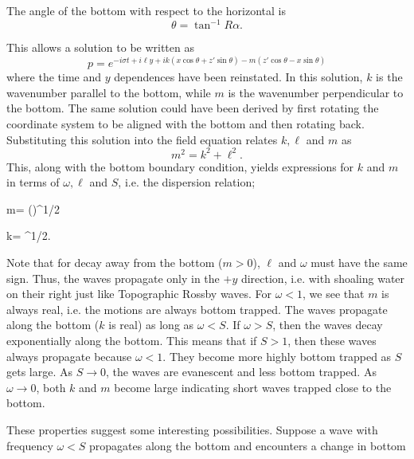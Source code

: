 The angle of the bottom with respect to the horizontal is
\[
	\theta=\tan^{-1}R\alpha.
\]

\sourcepagebreak

This allows a solution to be written as
\[
	p=e^{-i\sigma t+i\ell y
			+ik(x\cos\theta+z'\sin\theta)
			-m(z'\cos\theta-x\sin\theta)}
\]
where the time and $y$ dependences have been reinstated. In this solution, $k$ is the
wavenumber parallel to the bottom, while $m$ is the wavenumber perpendicular to the
bottom. The same solution could have been derived by first rotating the coordinate
system to be aligned with the bottom and then rotating back. Substituting this solution
into the field equation relates $k,\ell$ and $m$ as
\[
	m^2=k^2+\ell^2.
\]
This, along with the bottom boundary condition, yields expressions for $k$ and $m$ in
terms of $\omega,\ell$ and $S$, i.e. the dispersion relation;
\begin{waveequation}
	m=\frac{\ell}{\omega}
	\left(\right)^{1/2}
\end{waveequation}
\begin{waveequation}
	k=\frac{\ell}{\omega}
	^{1/2}.
\end{waveequation}
Note that for decay away from the bottom ($m>0$), $\ell$ and $\omega$ must have the
same sign. Thus, the waves propagate only in the $+y$ direction, i.e. with shoaling
water on their right just like Topographic Rossby waves. For $\omega<1$, we see that
$m$ is always real, i.e. the motions are always bottom trapped. The waves propagate
along the bottom ($k$ is real) as long as $\omega<S$. If $\omega>S$, then the waves
decay exponentially along the bottom. This means that if $S>1$, then these waves
always propagate because $\omega<1$. They become more highly bottom trapped as $S$
gets large. As $S\to0$, the waves are evanescent and less bottom trapped. As
$\omega\to0$, both $k$ and $m$ become large indicating short waves trapped close to
the bottom.

These properties suggest some interesting possibilities. Suppose a wave with frequency
$\omega<S$ propagates along the bottom and encounters a change in bottom


